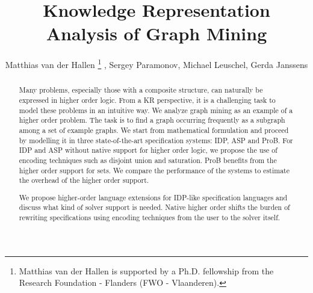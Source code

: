 \documentclass{llncs}
\author{Matthias van der Hallen\dag
\thanks{Matthias van der Hallen is supported by a Ph.D. fellowship from the Research Foundation - Flanders (FWO - Vlaanderen).\vspace{-3em}}
, Sergey Paramonov\dag, Michael Leuschel\ddag, Gerda Janssens\dag}
\title{Knowledge Representation Analysis of Graph Mining}
\institute{\dag KU Leuven, \ddag Heinrich-Heine-Universit\"at D\"usseldorf}
\begin{document}
\maketitle
\begin{abstract}
Many problems, especially those with a composite structure, can naturally be expressed in higher order logic. %
From a KR perspective, it is a challenging task to model these problems in an intuitive way.
We analyze graph mining as an example of a higher order problem. 
 The task is to find a graph occurring frequently as a subgraph among a set of example graphs.
We start from mathematical formulation
and proceed by modelling it
in three state-of-the-art specification systems: IDP, ASP and ProB.
For IDP and ASP without native support for higher order logic, we propose the use of encoding
techniques such as disjoint union and saturation.
ProB
benefits
from the higher order support for sets.
We compare the performance of the systems to estimate 
the overhead of the higher order support.

We propose higher-order language extensions for IDP-like
specification languages
and  discuss what kind of solver support is needed.
Native higher order shifts the burden of rewriting specifications using encoding techniques from the user to the solver itself.


\end{abstract}
\end{document}
